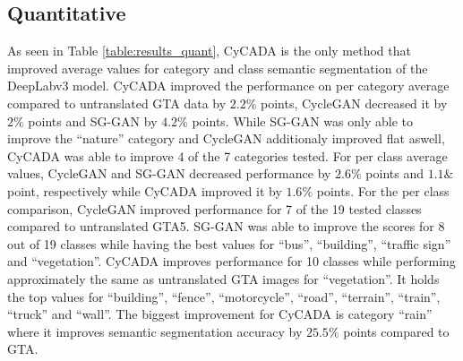 \subsection{Quantitative}
As seen in Table \ref{table:results_quant}, CyCADA is the only method that improved average values for category and class semantic segmentation of the DeepLabv3 model. CyCADA improved the performance on per category average compared to untranslated GTA data by $2.2\%$ points, CycleGAN decreased it by $2\%$ points and SG-GAN by $4.2\%$ points. While SG-GAN was only able to improve the ``nature'' category and CycleGAN additionaly improved flat aswell, CyCADA was able to improve 4 of the 7 categories tested. For per class average values, CycleGAN and SG-GAN decreased performance by $2.6\%$ points and $1.1\&$ point, respectively while CyCADA improved it by $1.6\%$ points. For the per class comparison, CycleGAN improved performance for 7 of the 19 tested classes compared to untranslated GTA5. SG-GAN was able to improve the scores for 8 out of 19 classes while having the best values for ``bus'', ``building'', ``traffic sign'' and ``vegetation''. CyCADA improves performance for 10 classes while performing approximately the same as untranslated GTA images for ``vegetation''. It holds the top values for ``building'', ``fence'', ``motorcycle'', ``road'', ``terrain'', ``train'', ``truck'' and ``wall''. The biggest improvement for CyCADA is category ``rain'' where it improves semantic segmentation accuracy by $25.5\%$ points compared to GTA.

